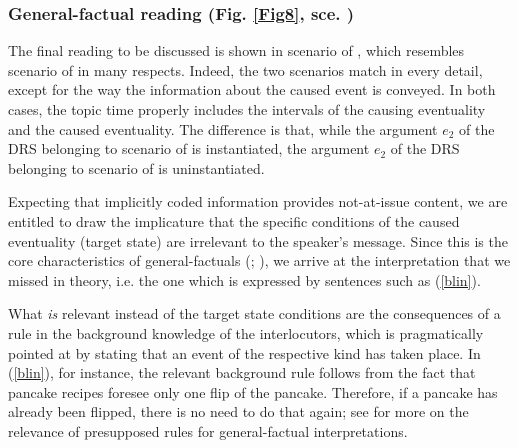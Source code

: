 \documentclass[output=paper,colorlinks,citecolor=brown]{langscibook}
\begin{document}
\subsubsection{General-factual reading (Fig. \ref{Fig8}, sce. )}
The final reading to be discussed is shown in scenario  of , which resembles scenario  of  in many respects.
Indeed, the two scenarios match in every detail, except for the way the information about the caused event is conveyed. 
In both cases, the topic time properly includes the intervals of the causing eventuality and the caused eventuality. 
The difference is that, while the argument $e_2$ of the DRS belonging to scenario  of  is instantiated, the argument $e_2$ of the DRS belonging to scenario  of  is uninstantiated.

Expecting that implicitly coded information provides not-at-issue content, we are entitled to draw the implicature that the specific conditions of the caused eventuality (target state) are irrelevant to the speaker's message. Since this is the core characteristics of general-factuals 
(\citealt[611]{Svedova1980}; \citealt{Gronn2004}), 
we arrive at the interpretation that we missed in  theory, i.e. the one which is expressed by sentences such as 
(\ref{blin}). 

What \textit{is} relevant instead of the target state conditions are the consequences of a rule in the background knowledge of the interlocutors, which is pragmatically pointed at by stating that an event of the respective kind has taken place. In (\ref{blin}), for instance, the relevant background rule follows from the fact that pancake recipes foresee only one flip of the pancake. Therefore, if a pancake has already been flipped, there is no need to do that again; see \citet{muellerhab} for more on the relevance of presupposed rules for general-factual interpretations. 


\end{document}
